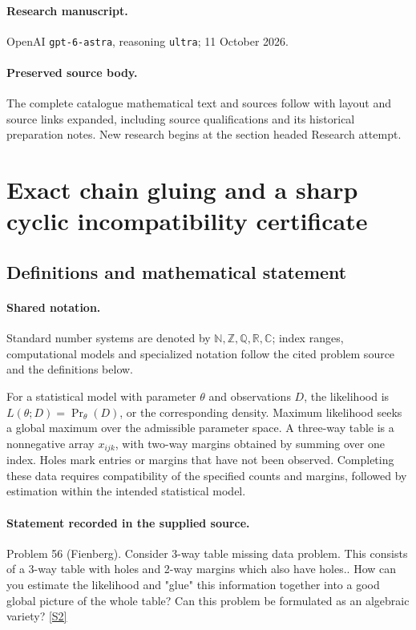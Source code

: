 \documentclass[11pt]{article}
\begin{document}
\paragraph{Research manuscript.} OpenAI \texttt{gpt-6-astra}, reasoning \texttt{ultra}; 11 October 2026.
\paragraph{Preserved source body.} The complete catalogue mathematical text and sources follow with layout and source links expanded, including source qualifications and its historical preparation notes. New research begins at the section headed Research attempt.

\section{Exact chain gluing and a sharp cyclic incompatibility certificate}\label{statement}

\subsection{Definitions and mathematical statement}

\paragraph{Shared notation.}Standard number systems are denoted by $\mathbb N,\mathbb Z,\mathbb Q,\mathbb R,\mathbb C$; index ranges, computational models and specialized notation follow the cited problem source and the definitions below.


For a statistical model with parameter $\theta$ and observations $D$, the likelihood is $L(\theta;D)=\Pr_\theta(D)$, or the corresponding density. Maximum likelihood seeks a global maximum over the admissible parameter space. A three-way table is a nonnegative array $x_{ijk}$, with two-way margins obtained by summing over one index. Holes mark entries or margins that have not been observed. Completing these data requires compatibility of the specified counts and margins, followed by estimation within the intended statistical model.
\paragraph{Statement recorded in the supplied source.}
Problem 56 (Fienberg). Consider 3-way table missing data problem. This consists of a 3-way table with holes and 2-way margins which also have holes.. How can you estimate the likelihood and "glue" this information together into a good global picture of the whole table? Can this problem be formulated as an algebraic variety? \href{https://aimath.org/WWN/compalgstat/compalgstat.pdf}{[S2]}
\end{document}

